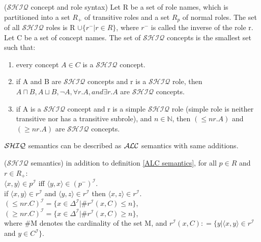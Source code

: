 \begin{mydef} 
\cite{handbook} ($\mathcal{SHIQ}$ concept and role syntax) Let R be a set of role names, which is partitioned into a set $R_+$ of transitive roles and a set $R_p$ of normal roles. 
The set of all $\mathcal{SHIQ}$ roles is R $\cup \{r^- | r \in R\}$, where $r^-$ is called the inverse of the role r. \\
Let C be a set of concept names. The set of $\mathcal{SHIQ}$ concepts is the smallest set such that:  
\begin{enumerate}
\item every concept $A \in C$ is a $\mathcal{SHIQ}$ concept.
\item if A and B are $\mathcal{SHIQ}$ concepts and r is a $\mathcal{SHIQ}$ role, then $A\sqcap B, A\sqcup B,  \neg A, \forall r.A,  and \exists r.A$ are $\mathcal{SHIQ}$ concepts.
\item if A is a $\mathcal{SHIQ}$ concept and r is a simple $\mathcal{SHIQ}$ role (simple role is neither transitive nor has a transitive subrole), and $n \in \mathbb{N}$, then $(\leq n r.A)$  and 
$(\geq n r.A)$ are $\mathcal{SHIQ}$ concepts.
\end{enumerate}
\end{mydef}
$\mathcal{SHIQ}$ semantics can be described as $\mathcal{ALC}$ semantics with same additions.

 \begin{mydef}($\mathcal{SHIQ}$ semantics) \cite{handbook}
in addition to definition \ref{ALC semantics}, for all  $p \in R$ and $r \in R_+$: \\
 $\langle x,y \rangle \in p^\mathcal{I}$ iff  $\langle y,x \rangle \in (p^- )^\mathcal{I}$. \\
 if $\langle x,y \rangle \in r^\mathcal{I}$ and $ \langle y,z \rangle \in r^\mathcal{I}$ then $\langle x,z \rangle \in r^\mathcal{I}$.\\
 $(\leq n r.C)^\mathcal{I} = \{x \in \Delta ^\mathcal{I} | \# r^\mathcal{I} (x,C) \leq n\}$,\\
$(\geq n r.C)^\mathcal{I} = \{x \in \Delta ^\mathcal{I} | \# r^\mathcal{I} (x,C) \geq n\}$,\\

where \#M  denotes the cardinality of the set M, and $r^\mathcal{I} (x,C) \mathrel{\mathop:}= \{y | \langle x,y \rangle \in r^\mathcal{I}$ and $y \in C^\mathcal{I}\}$.
\end{mydef}

